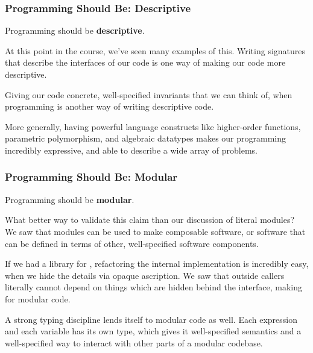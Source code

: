 \documentclass[aspectratio=169, handout]{beamer}
\begin{document}
\begin{frame}[fragile]
  \frametitle{Programming Should Be: Descriptive}

  Programming should be \textbf{descriptive}.

  \pause
  \vspace{\fill}

  At this point in the course, we've seen many examples of this. Writing
  signatures that describe the interfaces of our code is one way of making
  our code more descriptive.

  \pause
  \vspace{\fill}

  Giving our code concrete, well-specified invariants that we can think of,
  when programming is another way of writing descriptive code.

  \pause
  \vspace{\fill}

  More generally, having powerful language constructs like
  higher-order functions, parametric polymorphism, and algebraic datatypes
  makes our programming incredibly expressive, and able to describe a wide
  array of problems.
\end{frame}

\begin{frame}[fragile]
  \frametitle{Programming Should Be: Modular}

  Programming should be \textbf{modular}.

  \pause
  \vspace{\fill}

  What better way to validate this claim than our discussion of literal
  modules? We saw that modules can be used to make composable software, or
  software that can be defined in terms of other, well-specified software
  components.

  \pause
  \vspace{\fill}

  If we had a library for , refactoring the internal implementation
  is incredibly easy, when we hide the details via opaque ascription. We
  saw that outside callers literally cannot depend on things which are hidden
  behind the interface, making for modular code.

  \pause
  \vspace{\fill}

  A strong typing discipline lends itself to modular code as well. Each expression
  and each variable has its own type, which gives it well-specified semantics and
  a well-specified way to interact with other parts of a modular codebase.
\end{frame}
\end{document}
